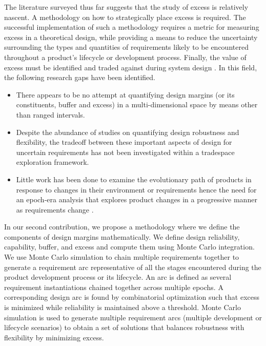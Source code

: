 
The literature surveyed thus far suggests that the study of excess is relatively nascent. A methodology on how to strategically place excess is required. The successful implementation of such a methodology requires a metric for measuring excess in a theoretical design, while providing a means to reduce the uncertainty surrounding the types and quantities of requirements likely to be encountered throughout a product's lifecycle or development process. Finally, the value of excess must be identified and traded against during system design \cite{Long2017}. In this field, the following research gaps have been identified.

\begin{itemize}
	\item There appears to be no attempt at quantifying design margins (or its constituents, buffer and excess) in a multi-dimensional space by means other than ranged intervals. 
	\item Despite the abundance of studies on quantifying design robustness and flexibility, the tradeoff between these important aspects of design for uncertain requirements has not been investigated within a tradespace exploration framework. 
	\item Little work has been done to examine the evolutionary path of products in response to changes in their environment or requirements hence the need for an epoch-era analysis that explores product changes in a progressive manner as requirements change \cite{Long2017,Cardin2017}.
\end{itemize}

In our second contribution, we propose a methodology where we define the components of design margins mathematically. We define design reliability, capability, buffer, and excess and compute them using Monte Carlo integration. We use Monte Carlo simulation to chain multiple requirements together to generate a requirement arc representative of all the stages encountered during the product development process or its lifecycle. An arc is defined as several requirement instantiations chained together across multiple epochs. A corresponding design arc is found by combinatorial optimization such that excess is minimized while reliability is maintained above a threshold. Monte Carlo simulation is used to generate multiple requirement arcs (multiple development or lifecycle scenarios) to obtain a set of solutions that balances robustness with flexibility by minimizing excess.

